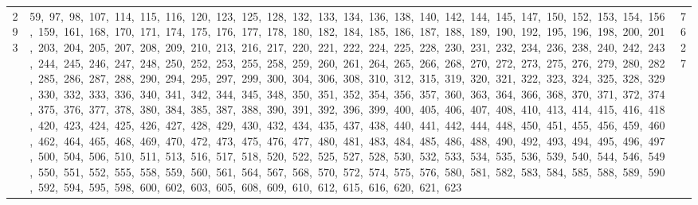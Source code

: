 \begin{longtable}{c|p{}|r}
293 & 59,\ 97,\ 98,\ 107,\ 114,\ 115,\ 116,\ 120,\ 123,\ 125,\ 128,\ 132,\ 133,\ 134,\ 136,\ 138,\ 140,\ 142,\ 144,\ 145,\ 147,\ 150,\ 152,\ 153,\ 154,\ 156,\ 159,\ 161,\ 168,\ 170,\ 171,\ 174,\ 175,\ 176,\ 177,\ 178,\ 180,\ 182,\ 184,\ 185,\ 186,\ 187,\ 188,\ 189,\ 190,\ 192,\ 195,\ 196,\ 198,\ 200,\ 201,\ 203,\ 204,\ 205,\ 207,\ 208,\ 209,\ 210,\ 213,\ 216,\ 217,\ 220,\ 221,\ 222,\ 224,\ 225,\ 228,\ 230,\ 231,\ 232,\ 234,\ 236,\ 238,\ 240,\ 242,\ 243,\ 244,\ 245,\ 246,\ 247,\ 248,\ 250,\ 252,\ 253,\ 255,\ 258,\ 259,\ 260,\ 261,\ 264,\ 265,\ 266,\ 268,\ 270,\ 272,\ 273,\ 275,\ 276,\ 279,\ 280,\ 282,\ 285,\ 286,\ 287,\ 288,\ 290,\ 294,\ 295,\ 297,\ 299,\ 300,\ 304,\ 306,\ 308,\ 310,\ 312,\ 315,\ 319,\ 320,\ 321,\ 322,\ 323,\ 324,\ 325,\ 328,\ 329,\ 330,\ 332,\ 333,\ 336,\ 340,\ 341,\ 342,\ 344,\ 345,\ 348,\ 350,\ 351,\ 352,\ 354,\ 356,\ 357,\ 360,\ 363,\ 364,\ 366,\ 368,\ 370,\ 371,\ 372,\ 374,\ 375,\ 376,\ 377,\ 378,\ 380,\ 384,\ 385,\ 387,\ 388,\ 390,\ 391,\ 392,\ 396,\ 399,\ 400,\ 405,\ 406,\ 407,\ 408,\ 410,\ 413,\ 414,\ 415,\ 416,\ 418,\ 420,\ 423,\ 424,\ 425,\ 426,\ 427,\ 428,\ 429,\ 430,\ 432,\ 434,\ 435,\ 437,\ 438,\ 440,\ 441,\ 442,\ 444,\ 448,\ 450,\ 451,\ 455,\ 456,\ 459,\ 460,\ 462,\ 464,\ 465,\ 468,\ 469,\ 470,\ 472,\ 473,\ 475,\ 476,\ 477,\ 480,\ 481,\ 483,\ 484,\ 485,\ 486,\ 488,\ 490,\ 492,\ 493,\ 494,\ 495,\ 496,\ 497,\ 500,\ 504,\ 506,\ 510,\ 511,\ 513,\ 516,\ 517,\ 518,\ 520,\ 522,\ 525,\ 527,\ 528,\ 530,\ 532,\ 533,\ 534,\ 535,\ 536,\ 539,\ 540,\ 544,\ 546,\ 549,\ 550,\ 551,\ 552,\ 555,\ 558,\ 559,\ 560,\ 561,\ 564,\ 567,\ 568,\ 570,\ 572,\ 574,\ 575,\ 576,\ 580,\ 581,\ 582,\ 583,\ 584,\ 585,\ 588,\ 589,\ 590,\ 592,\ 594,\ 595,\ 598,\ 600,\ 602,\ 603,\ 605,\ 608,\ 609,\ 610,\ 612,\ 615,\ 616,\ 620,\ 621,\ 623 & 7627 \\

\end{longtable}
